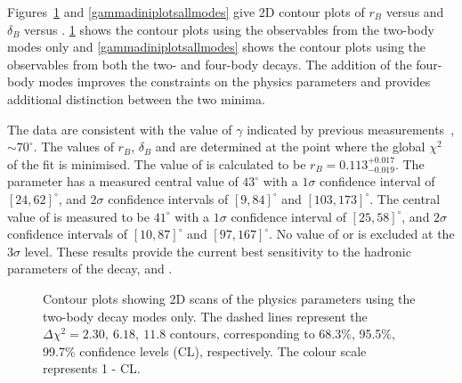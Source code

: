 Figures~\ref{gammadiniplots2body} and \ref{gammadiniplotsallmodes} give 2D contour plots of $r_B$ versus \Pgamma and $\delta_B$ versus \Pgamma. \Fig\ref{gammadiniplots2body} shows the contour plots using the \CP observables from the two-body modes only and \fig\ref{gammadiniplotsallmodes} shows the contour plots using the \CP observables from both the two- and four-body decays. The addition of the four-body modes improves the constraints on the physics parameters and provides additional distinction between the two minima. 

The data are consistent with the value of $\gamma$ indicated by previous measurements~\cite{LHCb-PAPER-2016-032, CKMFitter}, $\sim 70^\circ$. The values of $r_B$, $\delta_B$ and \Pgamma are determined at the point where the global $\chi^2$ of the fit is minimised. The value of \rb is calculated to be $r_B = 0.113^{+0.017}_{-0.019}$. The parameter \deltab has a measured central value of $43^{\circ}$ with a $1\sigma$ confidence interval of $[24, 62]^{\circ}$, and $2\sigma$ confidence intervals of $[9, 84]^{\circ}$ and $[103,173]^{\circ}$. The central value of \Pgamma is measured to be $41^{\circ}$ with a $1\sigma$ confidence interval of $[25, 58]^{\circ}$, and $2\sigma$ confidence intervals of $[10, 87]^{\circ}$ and $[97,167]^{\circ}$. No value of \Pgamma or \deltab is excluded at the $3\sigma$ level. These results provide the current best sensitivity to the hadronic parameters of the \Bm decay, \rb and \deltab.

\begin{figure}[h]
\centering
{}
\caption{Contour plots showing 2D scans of the physics parameters using the two-body \Dz decay modes only. The dashed lines represent the $\Delta \chi^2 = 2.30,\ 6.18,\ 11.8$ contours, corresponding to 68.3\%, 95.5\%, 99.7\% confidence levels (CL), respectively. The colour scale represents 1 - CL.}
\label{gammadiniplots2body}
\end{figure}

